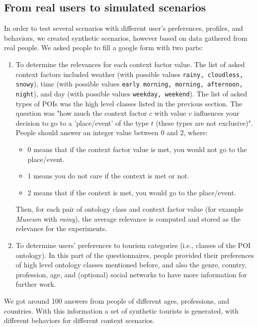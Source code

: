 \subsection{From real users to simulated scenarios}
\label{section:relevances-survey}

In order to test several scenarios with different user's preferences, profiles, and behaviors,  we created synthetic scenarios, however based on data gathered from real people.
We asked people to fill a google form with two parts: 

\begin{enumerate}
    \item To determine the relevances for each context factor value. The list of asked context factors included weather (with possible values {\tt rainy, cloudless, snowy}), time (with possible values {\tt early morning, morning, afternoon, night}), and day (with possible values {\tt weekday, weekend}). The list of asked types of POIs was the high level classes listed in the previous section. The question was "how much the context factor $c$ with value $v$ influences your decision to go to a 'place/event' of the type $t$ (these types are not exclusive)". People should answer an integer value between $0$ and $2$, where: 
\begin{itemize}
    \item $0$ means that if the context factor value is met, you would not go to the place/event.
    \item 1 means you do not care if the context is met or not.
    \item 2 means that if the context is met, you would go to the place/event.
\end{itemize}

Then, for each pair of ontology class and context factor value (for example \textit{Museum} with \textit{rainy}), the average relevance is computed and stored as the relevance for the experiments.


 \item To determine users' preferences to tourism categories (i.e., classes of the POI ontology). In this part of the questionnaires, people provided their preferences  of high level ontology classes mentioned before, and also the genre, country, profession, age, and (optional) social networks to have more information for further work.
 
\end{enumerate}
    
    We got around 100 answers from people of different ages, professions, and countries.  With this information a set of synthetic tourists is generated, with different behaviors for different context scenarios.
    



